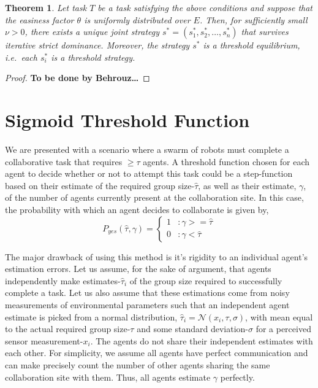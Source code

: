 \documentclass[conference]{ieeeconf}
\newtheorem{theorem}{Theorem}
\def\estt{\hat{\tau}}
\def\estg{\gamma}
\begin{document}
\begin{theorem}
Let task $T$ be a task satisfying the above conditions and suppose that the easiness factor $\theta$ is uniformly distributed over $E$. Then, for sufficiently small $\nu>0$, there exists a unique joint strategy $s^*=(s_1^*,s_2^*,\ldots,s_n^*)$ that survives iterative strict dominance. Moreover, the strategy $s^*$ is a threshold equilibrium, i.e.\ each $s_i^*$ is a threshold strategy.
\end{theorem}

\begin{proof}
\textbf{To be done by Behrouz\ldots}
\end{proof}

\section{Sigmoid Threshold Function}\label{sec:sig}
We are presented with a scenario where a swarm of robots must complete a collaborative task that requires $\geq \tau$ agents. A threshold function chosen for each agent to decide whether or not to attempt this task could be a step-function based on their estimate of the required group size-$\estt$, as well as their estimate, $\estg$, of the number of agents currently present at the collaboration site. In this case, the probability with which an agent decides to collaborate is given by, 
\begin{equation}\label{eq:step}
	P_{yes}(\estt,\estg) = \left\{
	\begin{array}{ll}
		1 & : \estg >= \estt\\ 
		0 & : \estg < \estt
	\end{array}\right.
\end{equation}

The major drawback of using this method is it's rigidity to an individual agent's estimation errors. Let us assume, for the sake of argument, that agents independently make estimates-$\estt_i$ of the group size required to successfully complete a task. Let us also assume that these estimations come from noisy measurements of environmental parameters such that an independent agent estimate is picked from a normal distribution, $\estt_i = \mathcal{N}(x_i, \tau, \sigma)$, with mean equal to the actual required group size-$\tau$ and some standard deviation-$\sigma$ for a perceived sensor measurement-$x_i$. The agents do not share their independent estimates with each other. For simplicity, we assume all agents have perfect communication and can make precisely count the number of other agents sharing the same collaboration site with them. Thus, all agents estimate $\estg$ perfectly.
\end{document}
